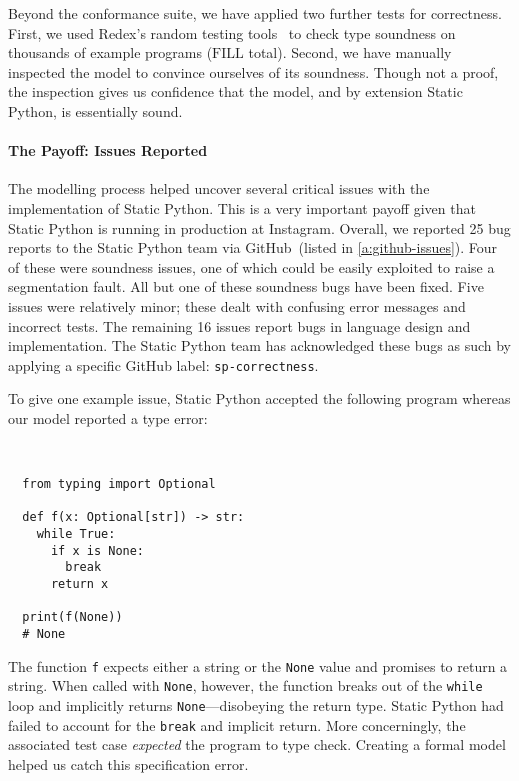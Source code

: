 \documentclass[english,cleveref,submission]{programming}
\newcommand{\SP}{Static Python}
\newcommand{\code}[1]{\texttt{#1}}
\newcommand{\totalnum}[1]{$#1$ total}
\begin{document}
Beyond the conformance suite, we have applied two further tests for correctness.
First, we used Redex's random testing tools~\cite{kf-sfp-2009} to check
type soundness on thousands of example programs (\totalnum{\mbox{FILL}}).
Second, we have manually inspected the model to convince ourselves
of its soundness.
Though not a proof, the inspection gives us confidence that the model,
and by extension \SP{}, is essentially sound.


\paragraph{The Payoff: Issues Reported}

The modelling process helped uncover several critical issues with the
implementation of \SP{}.
This is a very important payoff given that \SP{} is running in production at
Instagram.
Overall, we reported 25 bug reports to the \SP{} team via GitHub~(listed in
\cref{a:github-issues}).
Four of these were soundness issues, one of which could be easily exploited to raise
a segmentation fault.
All but one of these soundness bugs have been fixed.
Five issues were relatively minor; these dealt with confusing error messages
and incorrect tests.
The remaining 16 issues report bugs in language design and implementation.
The \SP{} team has acknowledged these bugs as such by applying a specific GitHub label: \lstinline{sp-correctness}.

To give one example issue, \SP{} accepted the following program whereas our model
reported a type error:

\medskip
\begin{minipage}[t]{0.25\columnwidth}~
\end{minipage}\begin{minipage}[t]{0.4\columnwidth}
\begin{lstlisting}
  from typing import Optional

  def f(x: Optional[str]) -> str:
    while True:
      if x is None:
        break
      return x

  print(f(None))
  # None
\end{lstlisting}
\end{minipage}

\noindent{}The function \code{f} expects either a string or the \code{None} value and promises to return a string.
When called with \code{None}, however, the function breaks out of the \code{while} loop
and implicitly returns \code{None}---disobeying the return type.
\SP{} had failed to account for the \code{break} and implicit return.
More concerningly, the associated test case \emph{expected} the program to type check.
Creating a formal model helped us catch this specification error.
\end{document}
